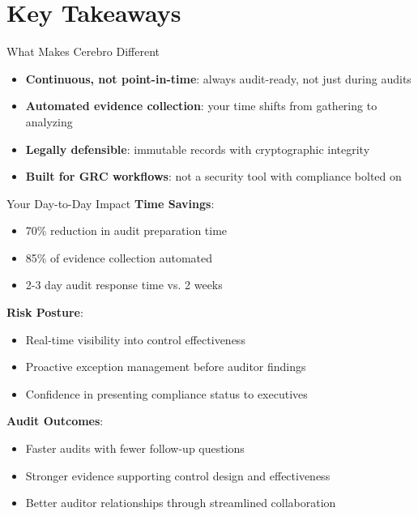\documentclass[aspectratio=169]{beamer}
\begin{document}
\section{Key Takeaways}

\begin{frame}{What Makes Cerebro Different}
  \begin{itemize}
    \item \textbf{Continuous, not point-in-time}: always audit-ready, not just during audits
    \item \textbf{Automated evidence collection}: your time shifts from gathering to analyzing
    \item \textbf{Legally defensible}: immutable records with cryptographic integrity
    \item \textbf{Built for GRC workflows}: not a security tool with compliance bolted on
  \end{itemize}
\end{frame}

\begin{frame}{Your Day-to-Day Impact}
  \textbf{Time Savings}:
  \begin{itemize}
    \item 70\% reduction in audit preparation time
    \item 85\% of evidence collection automated
    \item 2-3 day audit response time vs. 2 weeks
  \end{itemize}
  
  \vspace{0.3cm}
  
  \textbf{Risk Posture}:
  \begin{itemize}
    \item Real-time visibility into control effectiveness
    \item Proactive exception management before auditor findings
    \item Confidence in presenting compliance status to executives
  \end{itemize}
  
  \vspace{0.3cm}
  
  \textbf{Audit Outcomes}:
  \begin{itemize}
    \item Faster audits with fewer follow-up questions
    \item Stronger evidence supporting control design and effectiveness
    \item Better auditor relationships through streamlined collaboration
  \end{itemize}
\end{frame}
\end{document}
